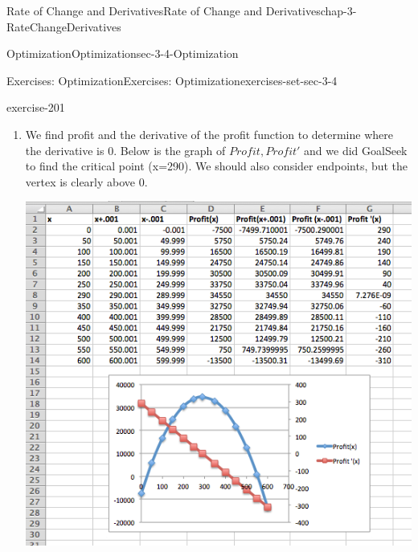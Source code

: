 \documentclass[oneside,10pt,]{book}
\numberwithin{equation}{section}
\newcommand{\lt}{<}
\newcommand{\gt}{>}
\begin{document}
\begin{chapterptx}{Rate of Change and Derivatives}{}{Rate of Change and Derivatives}{}{}{chap-3-RateChangeDerivatives}
\begin{sectionptx}{Optimization}{}{Optimization}{}{}{sec-3-4-Optimization}
\begin{exercises-subsection-numberless}{Exercises: Optimization}{}{Exercises: Optimization}{}{}{exercises-set-sec-3-4}
\begin{divisionexercise}{11}{}{}{exercise-201}
\begin{enumerate}[label=(\alph*)]
\begin{equation*}
profit(q)=revenue(q)- cost(q)
\end{equation*}
%
\begin{equation*}
= 300q-0.5 q^2-10q-7500
\end{equation*}
%
\begin{equation*}
= -0.5 q^2+290q-7500
\end{equation*}
\hypertarget{p-1302}{}%
One assumption that makes sense is that the price should be positive.%
%
\begin{equation*}
price(q)=300-0.5q \gt 0  
\end{equation*}
%
\begin{equation*}
-0.5 q \gt -300 
\end{equation*}
%
\begin{equation*}
q \lt 600
\end{equation*}
\item\hypertarget{li-416}{}\hypertarget{p-1303}{}%
We find profit and the derivative of the profit function to determine where the derivative is 0. Below is the graph of \(Profit, Profit'\) and we did GoalSeek to find the critical point (x=290).  We should also consider endpoints, but the vertex is clearly above 0. \begin{sidebyside}{1}{0.1}{0.1}{0}%
\begin{sbspanel}{0.8}%
\includegraphics[width=1\linewidth]{images/sec3-4-sol11a.png}
\end{sbspanel}%
\end{sidebyside}%

\end{enumerate}
\end{divisionexercise}
\end{exercises-subsection-numberless}
\end{sectionptx}
\end{chapterptx}
\end{document}
